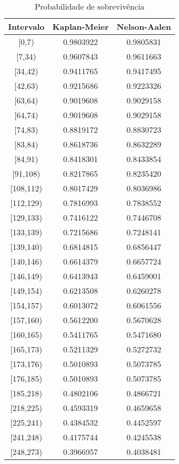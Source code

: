 \documentclass[
]{article}
\begin{document}
\begin{table}

\caption{\label{tab:unnamed-chunk-2}Probabilidade de sobrevivência}
\centering
\begin{tabular}[t]{ccc}
\toprule
Intervalo & Kaplan-Meier & Nelson-Aalen\\
\midrule
{}[0,7) & 0.9803922 & 0.9805831\\
{}[7,34) & 0.9607843 & 0.9611663\\
{}[34,42) & 0.9411765 & 0.9417495\\
{}[42,63) & 0.9215686 & 0.9223326\\
{}[63,64) & 0.9019608 & 0.9029158\\
\addlinespace
{}[64,74) & 0.9019608 & 0.9029158\\
{}[74,83) & 0.8819172 & 0.8830723\\
{}[83,84) & 0.8618736 & 0.8632289\\
{}[84,91) & 0.8418301 & 0.8433854\\
{}[91,108) & 0.8217865 & 0.8235420\\
\addlinespace
{}[108,112) & 0.8017429 & 0.8036986\\
{}[112,129) & 0.7816993 & 0.7838552\\
{}[129,133) & 0.7416122 & 0.7446708\\
{}[133,139) & 0.7215686 & 0.7248141\\
{}[139,140) & 0.6814815 & 0.6856447\\
\addlinespace
{}[140,146) & 0.6614379 & 0.6657724\\
{}[146,149) & 0.6413943 & 0.6459001\\
{}[149,154) & 0.6213508 & 0.6260278\\
{}[154,157) & 0.6013072 & 0.6061556\\
{}[157,160) & 0.5612200 & 0.5670628\\
\addlinespace
{}[160,165) & 0.5411765 & 0.5471680\\
{}[165,173) & 0.5211329 & 0.5272732\\
{}[173,176) & 0.5010893 & 0.5073785\\
{}[176,185) & 0.5010893 & 0.5073785\\
{}[185,218) & 0.4802106 & 0.4866721\\
\addlinespace
{}[218,225) & 0.4593319 & 0.4659658\\
{}[225,241) & 0.4384532 & 0.4452597\\
{}[241,248) & 0.4175744 & 0.4245538\\
{}[248,273) & 0.3966957 & 0.4038481\\

\end{tabular}
\end{table}
\end{document}

